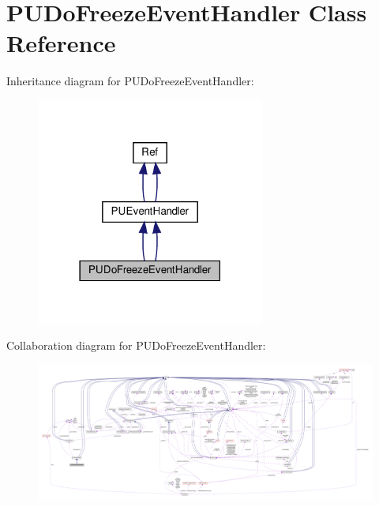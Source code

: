 \hypertarget{classPUDoFreezeEventHandler}{}\section{P\+U\+Do\+Freeze\+Event\+Handler Class Reference}
\label{classPUDoFreezeEventHandler}


Inheritance diagram for P\+U\+Do\+Freeze\+Event\+Handler\+:
\nopagebreak
\begin{figure}[H]
\begin{center}
\leavevmode
\includegraphics[width=213pt]{classPUDoFreezeEventHandler__inherit__graph}
\end{center}
\end{figure}


Collaboration diagram for P\+U\+Do\+Freeze\+Event\+Handler\+:
\nopagebreak
\begin{figure}[H]
\begin{center}
\leavevmode
\includegraphics[width=350pt]{classPUDoFreezeEventHandler__coll__graph}
\end{center}
\end{figure}
